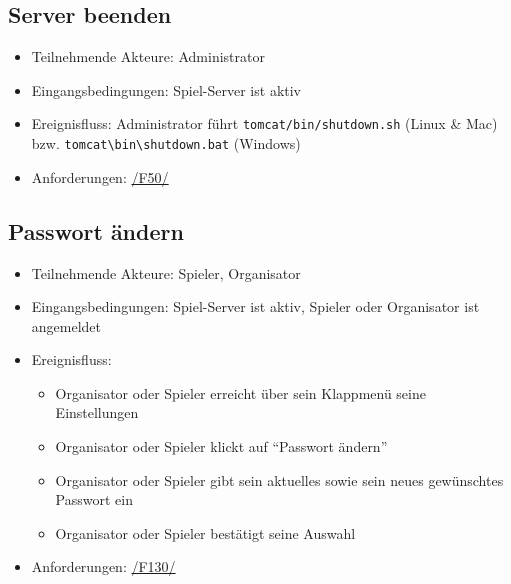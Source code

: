 \documentclass[a4paper]{scrreprt}
\begin{document}
    \subsection{Server beenden}
    \begin{itemize}
        \item Teilnehmende Akteure: \Gls{Administrator}
        \item Eingangsbedingungen: \Gls{Spiel-Server} ist aktiv
        \item Ereignisfluss: \Gls{Administrator} führt \texttt{tomcat/bin/shutdown.sh} (Linux \& Mac) bzw.  \texttt{tomcat\textbackslash bin\textbackslash shutdown.bat} (Windows)
        \item Anforderungen: \hyperlink{F50}{/F50/}
    \end{itemize}

    \subsection{Passwort ändern}
    \begin{itemize}
    \item Teilnehmende Akteure: \Gls{Spieler}, \Gls{Organisator}
    \item Eingangsbedingungen: \Gls{Spiel-Server} ist aktiv, \Gls{Spieler} oder \Gls{Organisator} ist angemeldet
    \item Ereignisfluss:
        \begin{itemize}
            \item \Gls{Organisator} oder \Gls{Spieler} erreicht über sein Klappmenü seine Einstellungen
            \item \Gls{Organisator} oder \Gls{Spieler} klickt auf \enquote{Passwort ändern}
            \item \Gls{Organisator} oder \Gls{Spieler} gibt sein aktuelles sowie sein neues gewünschtes Passwort ein
            \item \Gls{Organisator} oder \Gls{Spieler} bestätigt seine Auswahl
        \end{itemize}
        \item Anforderungen: \hyperlink{F130}{/F130/}
    \end{itemize}
	
\end{document}
